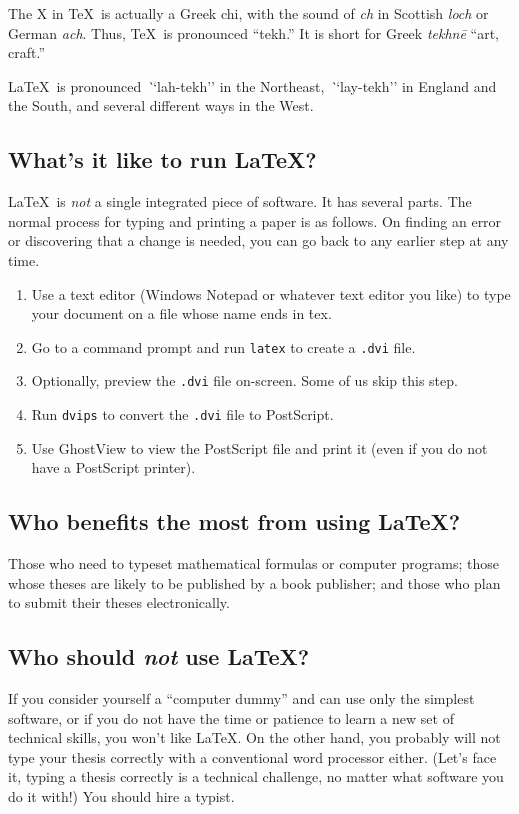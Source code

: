 \documentclass[12pt]{report}
\begin{document}
The X in \TeX\ is actually a Greek chi, with the sound of \emph{ch} in Scottish \emph{loch}
or German \emph{ach}.  Thus, \TeX\ is pronounced ``tekh.''  It is short for Greek
\emph{tekhn\={e}} ``art, craft.''

\LaTeX\ is pronounced \emph``lah-tekh'' in the Northeast, \emph``lay-tekh'' in England and
the South, and several different ways in the West.

\subsection{What's it like to run \LaTeX?}

\LaTeX\ is \emph{not} a single integrated piece of software.  It has several parts.  The normal
process for typing and printing a paper is as follows.  On finding an error or discovering that
a change is needed, you can go back to any earlier step at any time.
\begin{enumerate}
\item Use a text editor (Windows Notepad or whatever text editor you like) to type your
document on a file whose name ends in {\.tex}.
\item Go to a command prompt and run {\tt latex} to create a {\tt .dvi} file.
\item Optionally, preview the {\tt .dvi} file on-screen.  Some of us skip this step.
\item Run {\tt dvips} to convert the {\tt .dvi} file to PostScript.
\item Use GhostView to view the PostScript file and print it (even if you do not have
a PostScript printer).
\end{enumerate}

\subsection{Who benefits the most from using \LaTeX?}

Those who need to typeset mathematical formulas or computer programs;
those whose theses are likely to be published
by a book publisher; and those who plan to submit their theses electronically.

\subsection{Who should \emph{not} use \LaTeX?}

If you consider yourself a ``computer dummy'' and can use only the simplest software, or if you
do not have the time or patience to learn a new set of technical skills, you won't like \LaTeX.
On the other hand, you probably will not type your thesis correctly with a conventional word
processor either.  (Let's face it, typing a thesis correctly is a technical challenge,
no matter what software you do it with!)  You should hire a typist.
\end{document}
